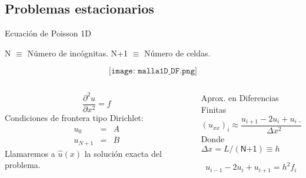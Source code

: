 \documentclass[handout]{beamer}
\begin{document}
\subsection{Problemas estacionarios}

\begin{frame}{Ecuaci\'on de Poisson 1D}

\textsf{N} $\equiv$ N\'umero de inc\'ognitas. \textsf{N+1} $\equiv$ N\'umero de celdas. 

$$\texttt{[image: malla1D\_DF.png]}$$

\pause

\begin{columns}
\begin{column}{0.45\textwidth}
\[
\frac{\partial^2 u}{\partial x^2} = f
\]
Condiciones de frontera tipo Dirichlet: 
\begin{eqnarray*}
u_0 & = & A\\ 
u_{N+1} & = & B
\end{eqnarray*}
Llamaremos a $\hat{u}(x)$ la soluci\'on exacta del problema.
\end{column}
\begin{column}{0.45\textwidth}

\pause 

Aprox. en Diferencias Finitas
\[
  (u_{xx})_i \approx \frac{u_{i+1} - 2 u_{i} + u_{i-1}}{\Delta x^2}
\]
Donde $\Delta x = L / (\textsf{N+1}) \equiv h$

\[
\boxed{u_{i-1} - 2 u_{i} + u_{i+1} = h^2 f_i}
\]

\end{column}
\end{columns}

\end{frame}
\end{document}

